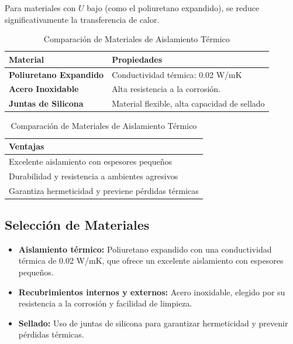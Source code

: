 \documentclass{article}
\begin{document}
\begin{multicols}{2}
	Para materiales con $U$ bajo (como el poliuretano expandido), se reduce significativamente la transferencia de calor.
	
 	
	
\begin{table}[H]
	\centering
	\caption{Comparación de Materiales de Aislamiento Térmico}
 
\setlength{\tabcolsep}{5pt} %
\begin{tabular}{|l|l|}
	\hline
	\textbf{Material} & \textbf{Propiedades} \\ \hline
	\textbf{Poliuretano Expandido} & Conductividad térmica: 0.02 W/mK \\ \hline
	\textbf{Acero Inoxidable} & Alta resistencia a la corrosión. \\ \hline
	\textbf{Juntas de Silicona} & Material flexible, alta capacidad de sellado \\ \hline
\end{tabular}
	
	\vspace{0.11cm} %
	
	\begin{tabular}{|l|}
		\hline
		\textbf{Ventajas} \\ \hline
		Excelente aislamiento con espesores pequeños \\ \hline
		Durabilidad y resistencia a ambientes agresivos \\ \hline
		Garantiza hermeticidad y previene pérdidas térmicas \\ \hline
	\end{tabular}
\end{table}




	\subsection{Selección de Materiales}
	\begin{itemize}
		\item \textbf{Aislamiento térmico:} Poliuretano expandido con una conductividad térmica de 0.02 W/mK, que ofrece un excelente aislamiento con espesores pequeños.
		\item \textbf{Recubrimientos internos y externos:} Acero inoxidable, elegido por su resistencia a la corrosión y facilidad de limpieza.
		\item \textbf{Sellado:} Uso de juntas de silicona para garantizar hermeticidad y prevenir pérdidas térmicas.
	\end{itemize}
	

\end{multicols}
\end{document}
